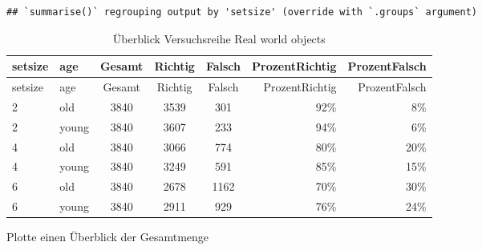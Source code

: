 \documentclass[
]{article}
\newenvironment{Shaded}{\begin{snugshade}}{\end{snugshade}}
\newcommand{\CommentTok}[1]{\textcolor[rgb]{0.56,0.35,0.01}{\textit{#1}}}
\newcommand{\DataTypeTok}[1]{\textcolor[rgb]{0.13,0.29,0.53}{#1}}
\newcommand{\DecValTok}[1]{\textcolor[rgb]{0.00,0.00,0.81}{#1}}
\newcommand{\KeywordTok}[1]{\textcolor[rgb]{0.13,0.29,0.53}{\textbf{#1}}}
\newcommand{\NormalTok}[1]{#1}
\newcommand{\OperatorTok}[1]{\textcolor[rgb]{0.81,0.36,0.00}{\textbf{#1}}}
\newcommand{\StringTok}[1]{\textcolor[rgb]{0.31,0.60,0.02}{#1}}
\begin{document}
\begin{verbatim}
## `summarise()` regrouping output by 'setsize' (override with `.groups` argument)
\end{verbatim}

\begin{longtable}[]{@{}llcccrr@{}}
\caption{Überblick Versuchsreihe Real world objects}\tabularnewline
\toprule
setsize & age & Gesamt & Richtig & Falsch & ProzentRichtig &
ProzentFalsch\tabularnewline
\midrule
\endfirsthead
\toprule
setsize & age & Gesamt & Richtig & Falsch & ProzentRichtig &
ProzentFalsch\tabularnewline
\midrule
\endhead
2 & old & 3840 & 3539 & 301 & 92\% & 8\%\tabularnewline
2 & young & 3840 & 3607 & 233 & 94\% & 6\%\tabularnewline
4 & old & 3840 & 3066 & 774 & 80\% & 20\%\tabularnewline
4 & young & 3840 & 3249 & 591 & 85\% & 15\%\tabularnewline
6 & old & 3840 & 2678 & 1162 & 70\% & 30\%\tabularnewline
6 & young & 3840 & 2911 & 929 & 76\% & 24\%\tabularnewline
\bottomrule
\end{longtable}

\begin{Shaded}
\end{Shaded}

Plotte einen Überblick der Gesamtmenge

\begin{Shaded}
\end{Shaded}
\end{document}
